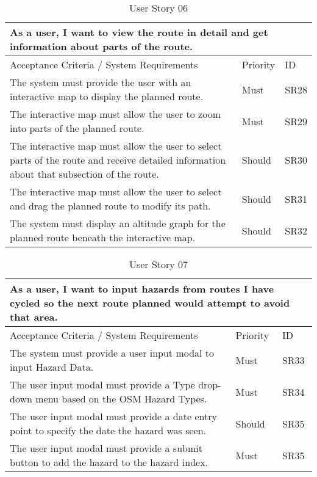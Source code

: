 \begin{table}[!htb]
\caption{User Story 06}
\label{tab:user-story-06}
\begin{tabular}{ p{8cm} p{1cm}  p{1cm} }
\hline
\multicolumn{3}{p{13cm}}{As a user, I want to view the route in detail and get information about parts of the route.}\\ 
\hline
Acceptance Criteria / System Requirements & Priority & ID\\
\hline
The system must provide the user with an interactive map to display the planned route. & Must & SR28 \\
The interactive map must allow the user to zoom into parts of the planned route. & Must & SR29\\
The interactive map must allow the user to select parts of the route and receive detailed information about that subsection of the route. & Should & SR30\\
The interactive map must allow the user to select and drag the planned route to modify its path. & Should & SR31\\ 
The system must display an altitude graph for the planned route beneath the interactive map. & Should & SR32\\ 
\hline
\end{tabular}
\end{table}

\begin{table}[!htb]
\caption{User Story 07}
\label{tab:user-story-06}
\begin{tabular}{ p{8cm} p{1cm}  p{1cm} }
\hline
\multicolumn{3}{p{13cm}}{As a user, I want to input hazards from routes I have cycled so the next route planned would attempt to avoid that area.}\\ 
\hline
Acceptance Criteria / System Requirements & Priority & ID\\
\hline
The system must provide a user input modal to input Hazard Data. & Must & SR33 \\
The user input modal must provide a Type drop-down menu based on the OSM Hazard Types. & Must & SR34\\
The user input modal must provide a date entry point to specify the date the hazard was seen. & Should & SR35\\
The user input modal must provide a submit button to add the hazard to the hazard index. & Must & SR35\\ 
\hline
\end{tabular}
\end{table}
